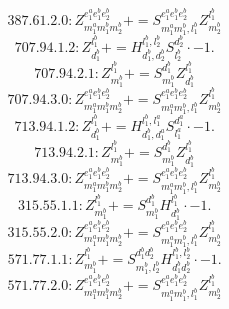 \documentclass[letterpaper,10pt,fleqn,leqno,onecolumn]{article}
\begin{document}
\begin{equation} \;\;\;\;\;\;  387.61.2.0: Z^{e_{1}^{a}e_{1}^{b}e_{2}^{b}}_{m_{1}^{a}m_{1}^{b}m_{2}^{b}}+=S^{e_{1}^{a}e_{1}^{b}e_{2}^{b}}_{m_{1}^{a}m_{1}^{b},l_{1}^{b}}Z^{l_{1}^{b}}_{m_{2}^{b}} \end{equation}
\begin{equation} \;\;\;\;\;\;  707.94.1.2: Z^{l_{1}^{b}}_{d_{1}^{b}}+=H^{l_{1}^{b},l_{2}^{b}}_{d_{1}^{b},d_{2}^{b}}S^{d_{2}^{b}}_{l_{2}^{b}}\cdot -1. \end{equation}
\begin{equation} \;\;\;\;\;\;  707.94.2.1: Z^{l_{1}^{b}}_{m_{1}^{b}}+=S^{d_{1}^{b}}_{m_{1}^{b}}Z^{l_{1}^{b}}_{d_{1}^{b}} \end{equation}
\begin{equation} \;\;\;\;\;\;  707.94.3.0: Z^{e_{1}^{a}e_{1}^{b}e_{2}^{b}}_{m_{1}^{a}m_{1}^{b}m_{2}^{b}}+=S^{e_{1}^{a}e_{1}^{b}e_{2}^{b}}_{m_{1}^{a}m_{1}^{b},l_{1}^{b}}Z^{l_{1}^{b}}_{m_{2}^{b}} \end{equation}
\begin{equation} \;\;\;\;\;\;  713.94.1.2: Z^{l_{1}^{b}}_{d_{1}^{b}}+=H^{l_{1}^{b},l_{1}^{a}}_{d_{1}^{b},d_{1}^{a}}S^{d_{1}^{a}}_{l_{1}^{a}}\cdot -1. \end{equation}
\begin{equation} \;\;\;\;\;\;  713.94.2.1: Z^{l_{1}^{b}}_{m_{1}^{b}}+=S^{d_{1}^{b}}_{m_{1}^{b}}Z^{l_{1}^{b}}_{d_{1}^{b}} \end{equation}
\begin{equation} \;\;\;\;\;\;  713.94.3.0: Z^{e_{1}^{a}e_{1}^{b}e_{2}^{b}}_{m_{1}^{a}m_{1}^{b}m_{2}^{b}}+=S^{e_{1}^{a}e_{1}^{b}e_{2}^{b}}_{m_{1}^{a}m_{1}^{b},l_{1}^{b}}Z^{l_{1}^{b}}_{m_{2}^{b}} \end{equation}
\begin{equation} \;\;\;\;\;\;  315.55.1.1: Z^{l_{1}^{b}}_{m_{1}^{b}}+=S^{d_{1}^{b}}_{m_{1}^{b}}H^{l_{1}^{b}}_{d_{1}^{b}}\cdot -1. \end{equation}
\begin{equation} \;\;\;\;\;\;  315.55.2.0: Z^{e_{1}^{a}e_{1}^{b}e_{2}^{b}}_{m_{1}^{a}m_{1}^{b}m_{2}^{b}}+=S^{e_{1}^{a}e_{1}^{b}e_{2}^{b}}_{m_{1}^{a}m_{1}^{b},l_{1}^{b}}Z^{l_{1}^{b}}_{m_{2}^{b}} \end{equation}
\begin{equation} \;\;\;\;\;\;  571.77.1.1: Z^{l_{1}^{b}}_{m_{1}^{b}}+=S^{d_{1}^{b}d_{2}^{b}}_{m_{1}^{b},l_{2}^{b}}H^{l_{1}^{b},l_{2}^{b}}_{d_{1}^{b}d_{2}^{b}}\cdot -1. \end{equation}
\begin{equation} \;\;\;\;\;\;  571.77.2.0: Z^{e_{1}^{a}e_{1}^{b}e_{2}^{b}}_{m_{1}^{a}m_{1}^{b}m_{2}^{b}}+=S^{e_{1}^{a}e_{1}^{b}e_{2}^{b}}_{m_{1}^{a}m_{1}^{b},l_{1}^{b}}Z^{l_{1}^{b}}_{m_{2}^{b}} \end{equation}
\end{document}
